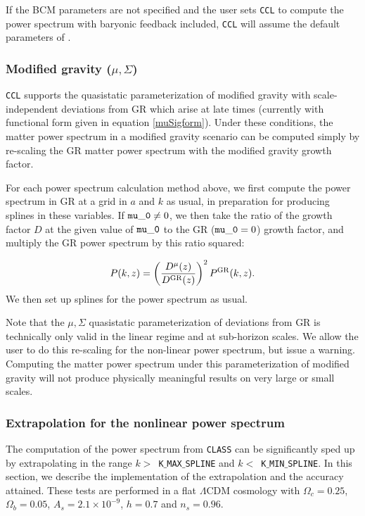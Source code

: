 \documentclass[\docopts]{\docclass}
\newcommand{\ccl}{{\tt CCL}\xspace}
\begin{document}
If the BCM parameters are not specified and the user sets \ccl to compute the power
spectrum with baryonic feedback included, \ccl will assume the default parameters
of \citet{Schneider15}.

\subsubsection{Modified gravity ($\mu, \Sigma$)}
\ccl supports the quasistatic parameterization of modified gravity with
scale-independent deviations from GR which arise at late times (currently with
functional form given in equation \ref{muSigform}). Under these conditions,
the matter power spectrum in a modified gravity scenario can be computed simply
by re-scaling the GR matter power spectrum with the modified gravity growth factor.

For each power spectrum calculation method above, we first compute the power spectrum
in GR at a grid in $a$ and $k$ as usual, in preparation for producing splines in
these variables. If ${\tt mu\_0} \ne 0$, we then take the ratio of the growth factor
$D$ at the given value of ${\tt mu\_0}$ to the GR (${\tt mu\_0}=0$) growth factor,
and multiply the GR power spectrum by this ratio squared:

\begin{equation}
P(k,z) = \left(\frac{D^{\mu}(z)}{D^{\rm GR}(z)}\right)^2 P^{\rm GR}(k,z).
\label{Pkmu}
\end{equation}
We then set up splines for the power spectrum as usual.

Note that the $\mu, \Sigma$ quasistatic parameterization of deviations from GR
is technically only valid in the linear regime and at sub-horizon scales. We
allow the user to do this re-scaling for the non-linear power spectrum, but
issue a warning. Computing the matter power spectrum under this parameterization
of modified gravity will not produce physically meaningful results on very large
or small scales.

\subsubsection{Extrapolation for the nonlinear power spectrum}
\label{sec:NLextrapol}

The computation of the power spectrum from {\tt CLASS} can be significantly sped
up by extrapolating in the range $k>$~{\tt K$\_$MAX$\_$SPLINE} and
$k<$~{\tt K$\_$MIN$\_$SPLINE}. In this section, we describe the implementation of the
extrapolation and the accuracy attained. These tests are performed in a flat
$\Lambda$CDM cosmology with $\Omega_c=0.25$, $\Omega_b=0.05$,
$A_s=2.1\times10^{-9}$, $h=0.7$ and $n_s=0.96$.
\end{document}
